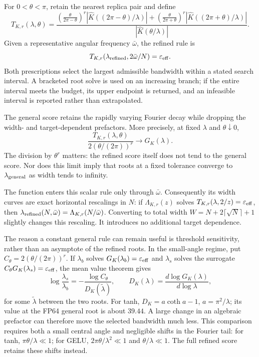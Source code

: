 \documentclass[11pt]{article}
\begin{document}
For $0<\theta<\pi$, retain the nearest replica pair and define
\begin{equation}
 T_{K,r}(\lambda,\theta)=
 \frac{
 \left(\frac{\theta}{2\pi-\theta}\right)^r
   |\widehat K((2\pi-\theta)/\lambda)|
 +\left(\frac{\theta}{2\pi+\theta}\right)^r
   |\widehat K((2\pi+\theta)/\lambda)|}
 {|\widehat K(\theta/\lambda)|}.
 \label{eq:bw-first-pair}
\end{equation}
Given a representative angular frequency $\bar\omega$, the refined rule is
\begin{equation}
 T_{K,r}(\lambda_{\rm refined},2\bar\omega/N)
 =\varepsilon_{\rm eff}.
 \label{eq:bw-refined-root}
\end{equation}
Both prescriptions select the largest admissible bandwidth within a stated
search interval. A bracketed root solve is used on an increasing branch;
if the entire interval meets the budget, its upper endpoint is returned,
and an infeasible interval is reported rather than extrapolated.

The general score retains the rapidly varying Fourier decay while dropping
the width- and target-dependent prefactors. More precisely, at fixed
$\lambda$ and $\theta\downarrow0$,
\begin{equation}
 \frac{T_{K,r}(\lambda,\theta)}{2(\theta/(2\pi))^r}
 \longrightarrow G_K(\lambda).
 \label{eq:bw-general-refined-limit}
\end{equation}
The division by $\theta^r$ matters: the refined score itself does not tend
to the general score. Nor does this limit imply that roots at a fixed
tolerance converge to $\lambda_{\rm general}$ as width tends to infinity.

The function enters this scalar rule only through $\bar\omega$.
Consequently its width curves are exact horizontal rescalings in $N$:
if $\Lambda_{K,r}(z)$ solves $T_{K,r}(\lambda,2/z)=\varepsilon_{\rm eff}$,
then $\lambda_{\rm refined}(N,\bar\omega)=\Lambda_{K,r}(N/\bar\omega)$.
Converting to total width $W=N+2\lceil\sqrt N\rceil+1$ slightly changes this
rescaling. It introduces no additional target dependence.

The reason a constant general rule can remain useful is threshold
sensitivity, rather than an asymptote of the refined roots. In the
small-angle regime, put $C_\theta=2(\theta/(2\pi))^r$. If $\lambda_b$ solves
$G_K(\lambda_b)=\varepsilon_{\rm eff}$ and $\lambda_s$ solves the surrogate
$C_\theta G_K(\lambda_s)=\varepsilon_{\rm eff}$, the mean value theorem gives
\begin{equation}
 \log\frac{\lambda_s}{\lambda_b}
 =-\frac{\log C_\theta}{D_K(\widetilde\lambda)},\qquad
 D_K(\lambda)=\frac{d\log G_K(\lambda)}{d\log\lambda},
 \label{eq:bw-threshold-sensitivity}
\end{equation}
for some $\widetilde\lambda$ between the two roots. For tanh,
$D_K=a\coth a-1$, $a=\pi^2/\lambda$; its value at the FP64 general root is
about $39.44$. A large change in an algebraic prefactor can therefore move
the selected bandwidth much less. This comparison requires both a small
central angle and negligible shifts in the Fourier tail: for tanh,
$\pi\theta/\lambda\ll1$; for GELU, $2\pi\theta/\lambda^2\ll1$ and
$\theta/\lambda\ll1$. The full refined score retains these shifts instead.
\end{document}
